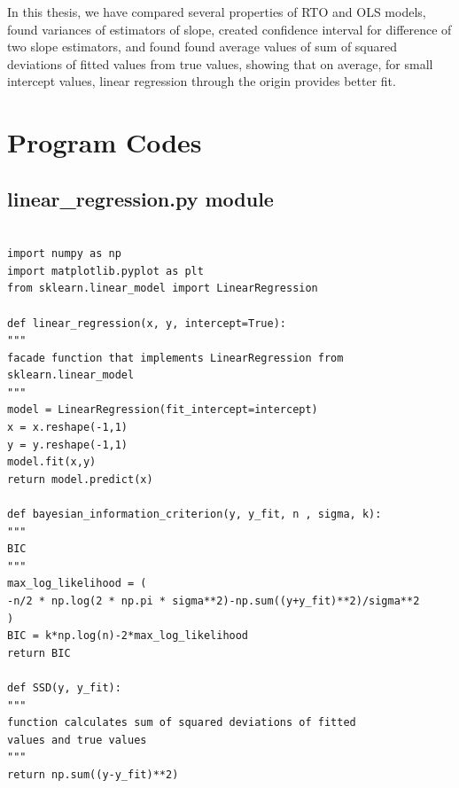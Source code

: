 \documentclass[12pt,a4paper,oneside]{book} %
\begin{document}
	In this thesis, we have compared several properties of RTO and OLS models, found variances of estimators of slope, created confidence interval for difference of two slope estimators, and found found average values of sum of squared deviations of fitted values from true values, showing that on average, for small intercept values, linear regression through the origin provides better fit.
	
	
	
	
	
	



	

	
	
	
	\appendix
	
	\chapter{Program Codes}
	
	\section{linear\_regression.py module}
	
	
\begin{mdframed}[linecolor=black, topline=true, bottomline=true,
	leftline=false, rightline=false, backgroundcolor=yellow!20!white]
	\begin{verbatim}
	
import numpy as np
import matplotlib.pyplot as plt
from sklearn.linear_model import LinearRegression

def linear_regression(x, y, intercept=True):
"""
facade function that implements LinearRegression from sklearn.linear_model
"""
model = LinearRegression(fit_intercept=intercept)
x = x.reshape(-1,1)
y = y.reshape(-1,1)
model.fit(x,y)
return model.predict(x)

def bayesian_information_criterion(y, y_fit, n , sigma, k):
"""
BIC 
"""
max_log_likelihood = (
-n/2 * np.log(2 * np.pi * sigma**2)-np.sum((y+y_fit)**2)/sigma**2
)
BIC = k*np.log(n)-2*max_log_likelihood
return BIC

def SSD(y, y_fit):
"""
function calculates sum of squared deviations of fitted
values and true values
"""
return np.sum((y-y_fit)**2)
	
	\end{verbatim}
\end{mdframed}
	
\end{document}
